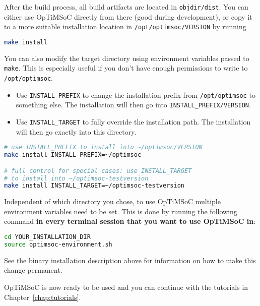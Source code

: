 After the build process, all build artifacts are located in \verb|objdir/dist|.
You can either use OpTiMSoC directly from there (good during development), or copy it to a more suitable installation location in \verb|/opt/optimsoc/VERSION| by running

\begin{lstlisting}[language=sh]
make install
\end{lstlisting}

You can also modify the target directory using environment variables passed to
\verb|make|. This is especially useful if you don't have enough permissions to
write to \verb|/opt/optimsoc|.

\begin{itemize}
  \item Use \verb|INSTALL_PREFIX| to change the installation prefix from
    \verb|/opt/optimsoc| to something else. The installation will then go
    into \verb|INSTALL_PREFIX/VERSION|.
  \item Use \verb|INSTALL_TARGET| to fully override the installation path.
    The installation will then go exactly into this directory.
\end{itemize}

\begin{lstlisting}[language=sh]
# use INSTALL_PREFIX to install into ~/optimsoc/VERSION
make install INSTALL_PREFIX=~/optimsoc

# full control for special cases: use INSTALL_TARGET
# to install into ~/optimsoc-testversion
make install INSTALL_TARGET=~/optimsoc-testversion
\end{lstlisting}


Independent of which directory you chose, to use OpTiMSoC multiple environment variables need to be set.
This is done by running the following command \textbf{in every terminal session that you want to use OpTiMSoC in}:

\begin{lstlisting}[language=sh]
cd YOUR_INSTALLATION_DIR
source optimsoc-environment.sh
\end{lstlisting}

See the binary installation description above for information on how to make this change permanent.

\medskip
OpTiMSoC is now ready to be used and you can continue with the tutorials in Chapter~\ref{chap:tutorials}.
